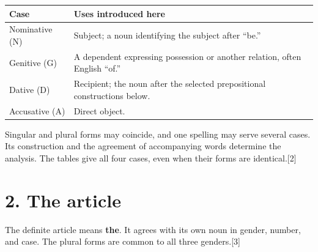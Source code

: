 \par\begingroup
\fontsize{10.5}{13.2}\selectfont
\setlength{\LTleft}{0pt}\setlength{\LTright}{\fill}
\noindent
\begin{tabular}{@{}>{\raggedright\arraybackslash}p{27.369mm}>{\raggedright\arraybackslash}p{93.819mm}@{}}
\toprule
\textbf{Case} & \textbf{Uses introduced here} \\
\midrule
Nominative (N) & Subject; a noun identifying the subject after “be.” \\
Genitive (G) & A dependent expressing possession or another relation, often English “of.” \\
Dative (D) & Recipient; the noun after the selected prepositional constructions below. \\
Accusative (A) & Direct object. \\
\bottomrule
\end{tabular}
\par\endgroup

Singular and plural forms may coincide, and one spelling may serve several cases. Its construction and the agreement of accompanying words determine the analysis. The tables give all four cases, even when their forms are identical.[2]

\section*{2. The article}

The definite article means \textbf{the}. It agrees with its own noun in gender, number, and case. The plural forms are common to all three genders.[3]

